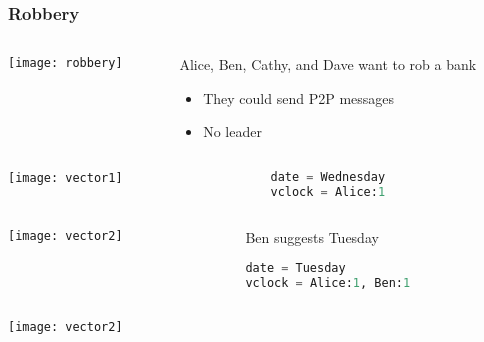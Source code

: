 \documentclass[aspectratio=169, 15pt,usenames,dvipsnames]{beamer}
\begin{document}
{\begin{gdblank}
	\end{gdblank}
	\begin{gdblank}
		\frametitle{Robbery}
		\begin{columns}
			\begin{column}{0.5\textwidth}
				\texttt{[image: robbery]}			
			\end{column}
			\begin{column}{0.5\textwidth}
				Alice, Ben, Cathy, and Dave want to rob a bank
				\begin{itemize}
					\item They could send P2P messages
					\item No leader
				\end{itemize}
			\end{column}	
		\end{columns}
	\end{gdblank}	
	\cprotEnv\begin{gdblank}
	\begin{columns}
		\begin{column}{0.5\textwidth}
			\texttt{[image: vector1]}			
		\end{column}
		\begin{column}{0.5\textwidth}				
			\begin{lstlisting}[language=Python]
date = Wednesday
vclock = Alice:1
			\end{lstlisting}
		\end{column}	
	\end{columns} 
	\end{gdblank}
	\cprotEnv\begin{gdblank}
	\begin{columns}
		\begin{column}{0.5\textwidth}
			\texttt{[image: vector2]}			
		\end{column}
		\begin{column}{0.5\textwidth}				
			Ben suggests Tuesday
			\begin{lstlisting}[language=Python]
date = Tuesday
vclock = Alice:1, Ben:1
			\end{lstlisting}
		\end{column}	
	\end{columns} 
	\end{gdblank}
	\cprotEnv\begin{gdblank}
	\begin{columns}
		\begin{column}{0.5\textwidth}
			\texttt{[image: vector2]}			

\end{column}
\end{columns}
\end{gdblank}}
\end{document}
